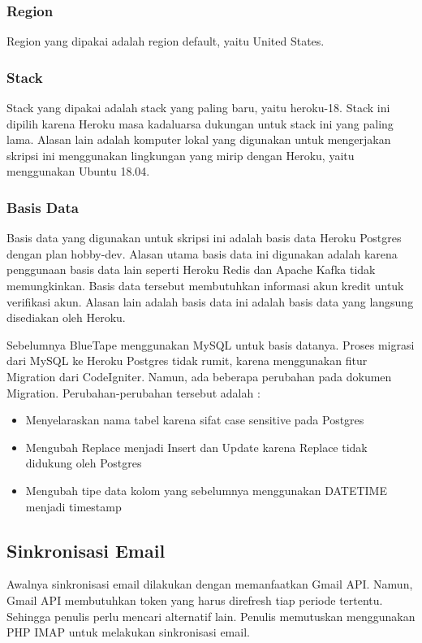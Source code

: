 	\subsubsection{Region}
		Region yang dipakai adalah region default, yaitu United States.
		
	\subsubsection{Stack}
		Stack yang dipakai adalah stack yang paling baru, yaitu heroku-18. Stack ini dipilih karena Heroku masa kadaluarsa dukungan untuk stack ini yang paling lama. Alasan lain adalah komputer lokal yang digunakan untuk mengerjakan skripsi ini menggunakan lingkungan yang mirip dengan Heroku, yaitu menggunakan Ubuntu 18.04.

	\subsubsection{Basis Data}
		Basis data yang digunakan untuk skripsi ini adalah basis data Heroku Postgres dengan plan hobby-dev. Alasan utama basis data ini digunakan adalah karena penggunaan basis data lain seperti Heroku Redis dan Apache Kafka tidak memungkinkan. Basis data tersebut membutuhkan informasi akun kredit untuk verifikasi akun. Alasan lain adalah basis data ini adalah basis data yang langsung disediakan oleh Heroku.
	
		Sebelumnya BlueTape menggunakan MySQL untuk basis datanya. Proses migrasi dari MySQL ke Heroku Postgres tidak rumit, karena menggunakan fitur Migration dari CodeIgniter. Namun, ada beberapa perubahan pada dokumen Migration. Perubahan-perubahan tersebut adalah :
	\begin{itemize}
		\item Menyelaraskan nama tabel karena sifat case sensitive pada Postgres
		\item Mengubah Replace menjadi Insert dan Update karena Replace tidak didukung oleh Postgres
		\item Mengubah tipe data kolom yang sebelumnya menggunakan DATETIME menjadi timestamp
	\end{itemize}  

\subsection{Sinkronisasi Email}
\label{sec:analisisemail}
	Awalnya sinkronisasi email dilakukan dengan memanfaatkan Gmail API. Namun, Gmail API membutuhkan token yang harus direfresh tiap periode tertentu. Sehingga penulis perlu mencari alternatif lain. Penulis memutuskan menggunakan PHP IMAP untuk melakukan sinkronisasi email.
	
